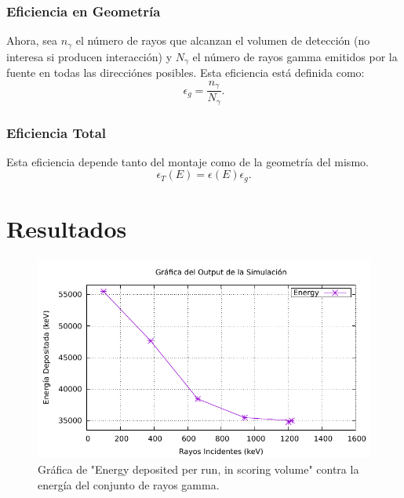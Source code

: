 \documentclass[conference]{IEEEtran}
\begin{document}
\subsubsection{Eficiencia en Geometría}
Ahora, sea $n_\gamma$ el número de rayos que alcanzan el volumen de detección (no interesa si producen interacción) y $N_\gamma$ el número de rayos gamma emitidos por la fuente en todas las direcciónes posibles. Esta eficiencia está definida como:
\begin{equation}
	\epsilon _g = \frac{n_\gamma}{N_\gamma}. \label{geometrica}
\end{equation}

\subsubsection{Eficiencia Total}        
Esta eficiencia depende tanto del montaje como de la geometría del mismo.
\begin{equation}
	\epsilon _T (E) = \epsilon (E) \epsilon _g.	\label{total}
\end{equation}
        
        
        
\section{Resultados}

\begin{figure}[H]
	\centering
	\includegraphics[scale=0.65]{./Codigos/Ajuste.pdf}
	\caption{Gráfica de "Energy deposited per run, in scoring volume" contra la energía del conjunto de rayos gamma.}
	\label{ajuste}
\end{figure}
    
    
\end{document}
